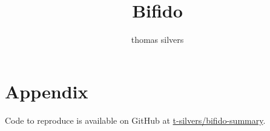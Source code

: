 \documentclass{article}
\title{Bifido}
\author{thomas silvers}
\begin{document}
\maketitle


\section{Appendix}

Code to reproduce is available on GitHub at \href{https://github.com/t-silvers/bifido-summary}{t-silvers/bifido-summary}.
\end{document}
